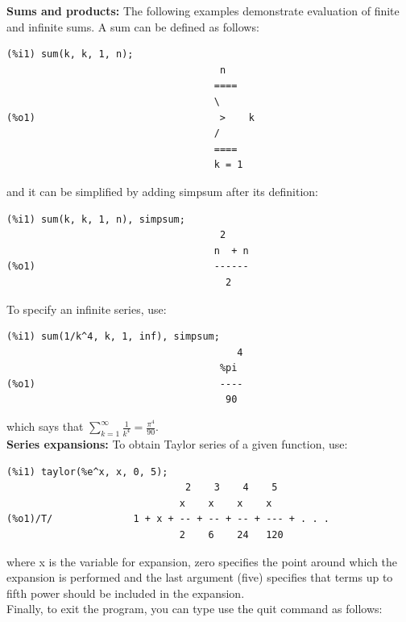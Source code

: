 \documentclass[byrevtex,amssymb,aps,pra,floatfix,letterpaper]{revtex4}
\begin{document}
\noindent
\textbf{Sums and products:} The following examples demonstrate evaluation of finite and infinite sums. A sum can be defined as follows:

\begin{verbatim}
(%i1) sum(k, k, 1, n);
                                     n
                                    ====
                                    \
(%o1)                                >    k
                                    /
                                    ====
                                    k = 1
\end{verbatim}

\noindent
and it can be simplified by adding simpsum after its definition:

\begin{verbatim}
(%i1) sum(k, k, 1, n), simpsum;
                                     2
                                    n  + n
(%o1)                               ------
                                      2
\end{verbatim}

\noindent
To specify an infinite series, use:

\begin{verbatim}
(%i1) sum(1/k^4, k, 1, inf), simpsum;
                                        4
                                     %pi
(%o1)                                ----
                                      90
\end{verbatim}

\noindent
which says that $\sum\limits_{k = 1}^{\infty}\frac{1}{k^4} = \frac{\pi^4}{90}$.\\

\noindent
\textbf{Series expansions:} To obtain Taylor series of a given function, use:

\begin{verbatim}
(%i1) taylor(%e^x, x, 0, 5);
                               2    3    4    5
                              x    x    x    x
(%o1)/T/              1 + x + -- + -- + -- + --- + . . .
                              2    6    24   120
\end{verbatim}

\noindent
where x is the variable for expansion, zero specifies the point around which the expansion is performed and the last argument (five) specifies that terms up to fifth power should be included in the expansion.\\

\noindent
Finally, to exit the program, you can type use the quit command as follows:\\
\end{document}
